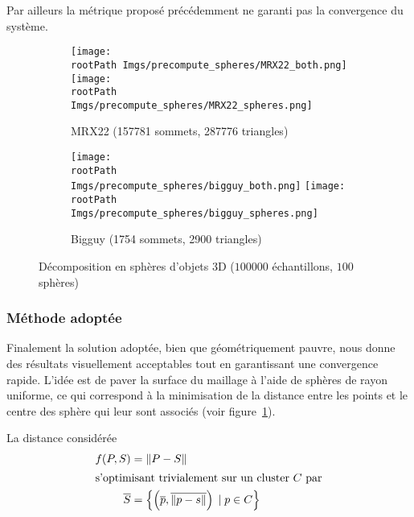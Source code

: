 \documentclass[10pt,a4paper,twoside, twocolumn]{report}
\newcommand*{\rootPath}{../}
\begin{document}
Par ailleurs la métrique proposé précédemment ne garanti pas la convergence du système.

\begin{figure}[!ht]\centering
	\begin{subfigure}[b]{0.4\textwidth}\centering
		\texttt{[image: \\rootPath Imgs/precompute\_spheres/MRX22\_both.png]}
		\vspace{0.5cm}
		\texttt{[image: \\rootPath Imgs/precompute\_spheres/MRX22\_spheres.png]}
		\caption{MRX22 (157781 sommets, 287776 triangles)}
	\end{subfigure}
	\begin{subfigure}[b]{0.4\textwidth}\centering
		\texttt{[image: \\rootPath Imgs/precompute\_spheres/bigguy\_both.png]}
		\vspace{0.5cm}
		\texttt{[image: \\rootPath Imgs/precompute\_spheres/bigguy\_spheres.png]}
		\caption{Bigguy (1754 sommets, 2900 triangles)}
	\end{subfigure}
	
	\caption{Décomposition en sphères d'objets 3D ($100000$ échantillons, $100$ sphères)}
	\label{fig:precompute_sphere:result}
\end{figure}

\subsubsection{Méthode adoptée}

Finalement la solution adoptée, bien que géométriquement pauvre, nous donne des résultats visuellement acceptables tout en garantissant une convergence rapide. L'idée est de paver la surface du maillage à l'aide de sphères de rayon uniforme, ce qui correspond à la minimisation de la distance entre les points et le centre des sphère qui leur sont associés (voir figure~\ref{fig:precompute_sphere:result}).

La distance considérée
\begin{align}
	f(P, S)			&= \left\|P-S\right\|	\\
\intertext{s'optimisant trivialement sur un cluster $C$ par}
	\overline S	&= \left\{ \left(\overline p, \overline{\|p-s\|}\right)\;|\;p \in C \right\}
\end{align}

\ifstandalone
	
	
\fi
\end{document}
